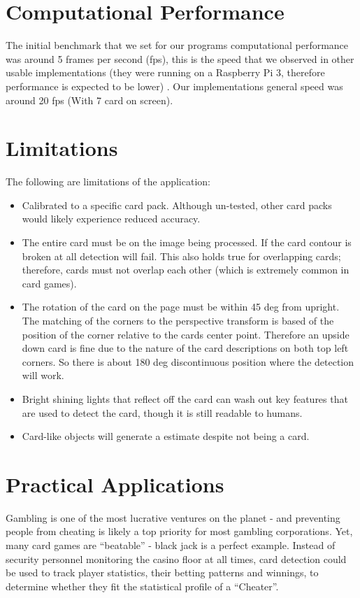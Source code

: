 \documentclass[conference]{IEEEtran}
\begin{document}
\section{Computational Performance}
The initial benchmark that we set for our programs computational performance was around 5 frames per
second (fps), this is the speed that we observed in other usable implementations (they were running
on a Raspberry Pi 3, therefore performance is expected to be lower) \cite{opencv-card-detection}.
Our implementations general speed was around 20 fps (With 7 card on screen).

\section{Limitations}
The following are limitations of the application:
\begin{itemize}
\item Calibrated to a specific card pack. Although un-tested, other card packs would likely
        experience reduced accuracy.
\item The entire card must be on the image being processed. If the card contour is broken at all
        detection will fail. This also holds true for overlapping cards; therefore, cards must not
        overlap each other (which is extremely common in card games).
\item The rotation of the card on the page must be within 45 deg from upright. The matching of the
        corners to the perspective transform is based of the position of the corner relative to the
        cards center point. Therefore an upside down card is fine due to the nature of the card
        descriptions on both top left corners. So there is about 180 deg discontinuous position
        where the detection will work.
\item Bright shining lights that reflect off the card can wash out key features that are used to
        detect the card, though it is still readable to humans.
\item Card-like objects will generate a estimate despite not being a card.
\end{itemize}

\section{Practical Applications}
Gambling is one of the most lucrative ventures on the planet - and preventing people from cheating
is likely a top priority for most gambling corporations. Yet, many card games are ``beatable'' - black
jack is a perfect example. Instead of security personnel monitoring the casino floor at all times,
card detection could be used to track player statistics, their betting patterns and winnings, to
determine whether they fit the statistical profile of a ``Cheater''.
\end{document}
